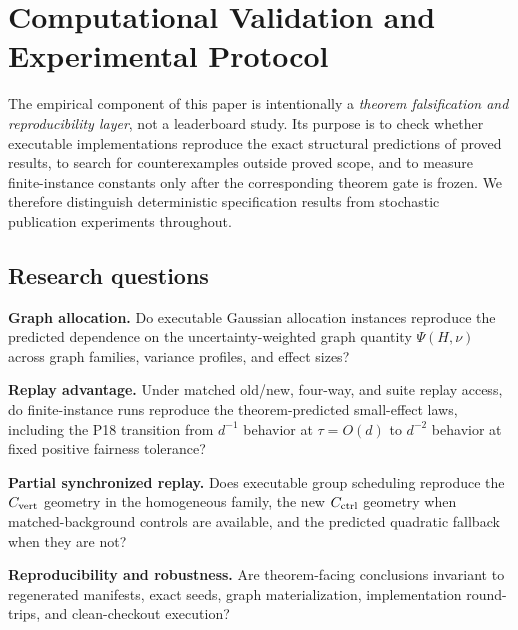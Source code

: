 \section{Computational Validation and Experimental Protocol}
\label{sec:evaluation}

The empirical component of this paper is intentionally a \emph{theorem
falsification and reproducibility layer}, not a leaderboard study. Its purpose
is to check whether executable implementations reproduce the exact structural
predictions of proved results, to search for counterexamples outside proved
scope, and to measure finite-instance constants only after the corresponding
theorem gate is frozen. We therefore distinguish deterministic specification
results from stochastic publication experiments throughout.

\subsection{Research questions}

\begin{description}[leftmargin=1.8cm,labelwidth=1.45cm,style=nextline]
\item[\textbf{RQ1}] \textbf{Graph allocation.}
Do executable Gaussian allocation instances reproduce the predicted dependence
on the uncertainty-weighted graph quantity $\Psi(H,\nu)$ across graph families,
variance profiles, and effect sizes?

\item[\textbf{RQ2}] \textbf{Replay advantage.}
Under matched old/new, four-way, and suite replay access, do finite-instance
runs reproduce the theorem-predicted small-effect laws, including the P18
transition from $d^{-1}$ behavior at $\tau=O(d)$ to $d^{-2}$ behavior at fixed
positive fairness tolerance?

\item[\textbf{RQ3}] \textbf{Partial synchronized replay.}
Does executable group scheduling reproduce the $C_{\rm vert}$ geometry in the
homogeneous family, the new $C_{\rm ctrl}$ geometry when matched-background
controls are available, and the predicted quadratic fallback when they are not?

\item[\textbf{RQ4}] \textbf{Reproducibility and robustness.}
Are theorem-facing conclusions invariant to regenerated manifests, exact seeds,
graph materialization, implementation round-trips, and clean-checkout execution?
\end{description}

